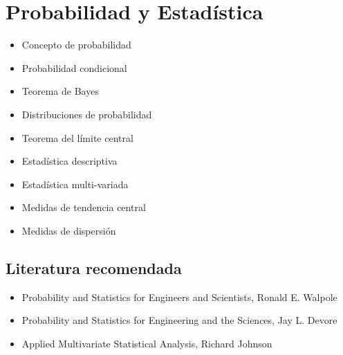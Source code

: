 \documentclass{article}
\begin{document}
    \section{Probabilidad y Estadística}

        \begin{itemize}
            \item Concepto de probabilidad
            \item Probabilidad condicional
            \item Teorema de Bayes
            \item Distribuciones de probabilidad
            \item Teorema del límite central
            \item Estadística descriptiva
            \item Estadística multi-variada
            \item Medidas de tendencia central
            \item Medidas de dispersión
        \end{itemize}

        \subsection{Literatura recomendada}

            \begin{itemize}
                \item Probability and Statistics for Engineers and Scientists, Ronald E. Walpole \cite{walpole1993probability}
                \item Probability and Statistics for Engineering and the Sciences, Jay L. Devore \cite{devore2011probability}
                \item Applied Multivariate Statistical Analysis, Richard Johnson \cite{johnson2014applied}
            \end{itemize}

    
    
\end{document}

